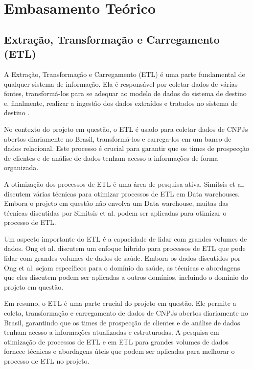 \section{Embasamento Teórico}

\subsection{Extração, Transformação e Carregamento (ETL)}

A Extração, Transformação e Carregamento (ETL) é uma parte fundamental de qualquer sistema de informação. Ela é responsável por coletar dados de várias fontes, transformá-los para se adequar ao modelo de dados do sistema de destino e, finalmente, realizar a ingestão dos dados extraídos e tratados no sistema de destino \cite{simitsis2005optimizing}. 

No contexto do projeto em questão, o ETL é usado para coletar dados de CNPJs abertos diariamente no Brasil, transformá-los e carrega-los em um banco de dados relacional. Este processo é crucial para garantir que os times de prospecção de clientes e de análise de dados tenham acesso a informações de forma organizada.

A otimização dos processos de ETL é uma área de pesquisa ativa. Simitsis et al. \cite{simitsis2005optimizing} discutem várias técnicas para otimizar processos de ETL em Data warehouses. Embora o projeto em questão não envolva um  Data warehouse, muitas das técnicas discutidas por Simitsis et al. podem ser aplicadas para otimizar o processo de ETL.

Um aspecto importante do ETL é a capacidade de lidar com grandes volumes de dados. Ong et al. \cite{ong2017dynamic} discutem um enfoque híbrido para processos de ETL que pode lidar com grandes volumes de dados de saúde. Embora os dados discutidos por Ong et al. sejam específicos para o domínio da saúde, as técnicas e abordagens que eles discutem podem ser aplicadas a outros domínios, incluindo o domínio do projeto em questão.

Em resumo, o ETL é uma parte crucial do projeto em questão. Ele permite a coleta, transformação e carregamento de dados de CNPJs abertos diariamente no Brasil, garantindo que os times de prospecção de clientes e de análise de dados tenham acesso a informações atualizadas e estruturadas. A pesquisa em otimização de processos de ETL e em ETL para grandes volumes de dados fornece técnicas e abordagens úteis que podem ser aplicadas para melhorar o processo de ETL no projeto.




